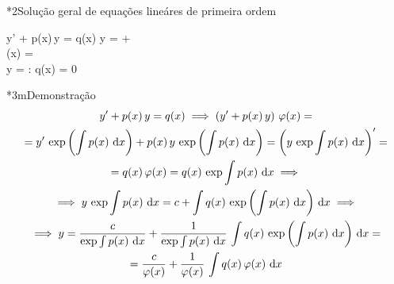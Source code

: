\documentclass["AM3C-Slides_annotations.tex"]{subfiles}
\begin{document}
\begin{sectionBox}*2{Solução geral de equações lineáres de primeira ordem} %
  \begin{BM}
    y' + p(x)\,y = q(x)
    \implies y 
    = 
    + 
    \,
    \\
    \varphi(x) = 
    \\[3ex]
    y 
    = 
    : q(x) = 0 
  \end{BM}
  \vspace{-3ex}
  \begin{sectionBox}*3m{Demonstração} %
    \begin{gather*}
        y' + p(x)\,y = q(x)
        \implies
        \left(
          y' + p(x)\,y 
        \right)\,\varphi(x)
        = \\
        = y'\,\exp{\left(\int{p(x)\,\odif{x}}\right)}
        + p(x)\,y\,\exp{\left( \int{p(x)\,\odif{x}} \right)}
        = \left(
          y\,\exp{\int{p(x)\,\odif{x}}}
        \right)'
        = \\
        = q(x)\,\varphi(x)
        = q(x)\,\exp{\int{p(x)\,\odif{x}}}
        \implies \\
        \implies y\,\exp{\int{p(x)\,\odif{x}}}
        = c+\int{
          q(x)\,\exp{\left(\int{p(x)\,\odif{x}}\right)}
          \,\odif{x}
        }
        \implies \\
        \implies y
        = \frac{c}{\exp{\int{p(x)\,\odif{x}}}}
        + \frac{1}{\exp{\int{p(x)\,\odif{x}}}}
        \,\int{
          q(x)\,\exp{\left(\int{p(x)\,\odif{x}}\right)}
          \,\odif{x}
        }
        = \\
        = \frac{c}{\varphi(x)}
        + \frac{1}{\varphi(x)}
        \,\int{q(x)\,\varphi(x)\,\odif{x}}
      \end{gather*}
  \end{sectionBox}
\end{sectionBox}
\end{document}
